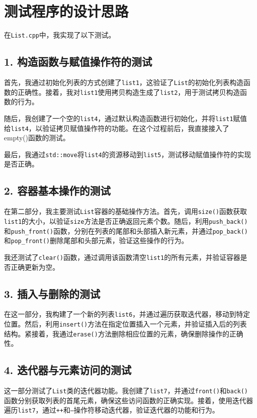 \documentclass[UTF8]{ctexart}
\begin{document}
\pagestyle{fancy}
\fancyhead{}

\section{测试程序的设计思路}
在\texttt{List.cpp}中，我实现了以下测试。
\subsection*{1. 构造函数与赋值操作符的测试}
首先，我通过初始化列表的方式创建了\texttt{list1}，这验证了\texttt{List}的初始化列表构造函数的正确性。接着，我对\texttt{list1}使用拷贝构造生成了\texttt{list2}，用于测试拷贝构造函数的行为。

随后，我创建了一个空的\texttt{list4}，通过默认构造函数进行初始化，并将\texttt{list1}赋值给\texttt{list4}，以验证拷贝赋值操作符的功能。在这个过程前后，我直接接入了empty()函数的测试。

最后，我通过\texttt{std::move}将\texttt{list4}的资源移动到\texttt{list5}，测试移动赋值操作符的实现是否正确。

\subsection*{2. 容器基本操作的测试}
在第二部分，我主要测试\texttt{List}容器的基础操作方法。首先，调用\texttt{size()}函数获取\texttt{list1}的大小，以验证\texttt{size}方法是否正确返回元素个数。随后，利用\texttt{push\_back()}和\texttt{push\_front()}函数，分别在列表的尾部和头部插入新元素，并通过\texttt{pop\_back()}和\texttt{pop\_front()}删除尾部和头部元素，验证这些操作的行为。

我还测试了\texttt{clear()}函数，通过调用该函数清空\texttt{list1}的所有元素，并验证容器是否正确更新为空。

\subsection*{3. 插入与删除的测试}
在这一部分，我构建了一个新的列表\texttt{list6}，并通过遍历获取迭代器，移动到特定位置。然后，利用\texttt{insert()}方法在指定位置插入一个元素，并验证插入后的列表结构。紧接着，我通过\texttt{erase()}方法删除相应位置的元素，确保删除操作的正确性。

\subsection*{4. 迭代器与元素访问的测试}
这一部分测试了\texttt{List}类的迭代器功能。我创建了\texttt{list7}，并通过\texttt{front()}和\texttt{back()}函数分别获取列表的首尾元素，确保这些访问函数的正确实现。接着，使用迭代器遍历\texttt{list7}，通过\texttt{++}和\texttt{--}操作符移动迭代器，验证迭代器的功能和行为。
\end{document}
